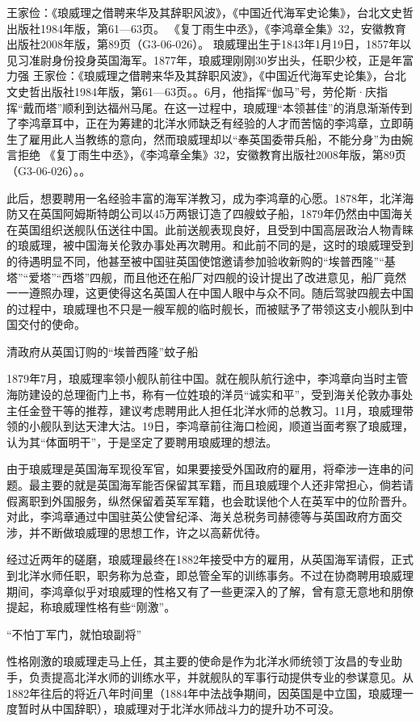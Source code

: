 \documentclass[12pt,UTF8]{ctexbook}
\begin{document}
王家俭：《琅威理之借聘来华及其辞职风波》，《中国近代海军史论集》，台北文史哲出版社1984年版，第61—63页。
《复丁雨生中丞》，《李鸿章全集》32，安徽教育出版社2008年版，第89页（G3-06-026）。
琅威理出生于1843年1月19日，1857年以见习准尉身份投身英国海军。1877年，琅威理刚刚30岁出头，任职少校，正是年富力强 王家俭：《琅威理之借聘来华及其辞职风波》，《中国近代海军史论集》，台北文史哲出版社1984年版，第61—63页。。6月，他指挥“伽马”号，劳伦斯·庆指挥“戴而塔”顺利到达福州马尾。在这一过程中，琅威理“本领甚佳”的消息渐渐传到了李鸿章耳中，正在为筹建的北洋水师缺乏有经验的人才而苦恼的李鸿章，立即萌生了雇用此人当教练的意向，然而琅威理却以“奉英国委带兵船，不能分身”为由婉言拒绝 《复丁雨生中丞》，《李鸿章全集》32，安徽教育出版社2008年版，第89页（G3-06-026）。。

此后，想要聘用一名经验丰富的海军洋教习，成为李鸿章的心愿。1878年，北洋海防又在英国阿姆斯特朗公司以45万两银订造了四艘蚊子船，1879年仍然由中国海关在英国组织送舰队伍送往中国。此前送舰表现良好，且受到中国高层政治人物青睐的琅威理，被中国海关伦敦办事处再次聘用。和此前不同的是，这时的琅威理受到的待遇明显不同，他甚至被中国驻英国使馆邀请参加验收新购的“埃普西隆”“基塔”“爱塔”“西塔”四舰，而且他还在船厂对四舰的设计提出了改进意见，船厂竟然一一遵照办理，这更使得这名英国人在中国人眼中与众不同。随后驾驶四舰去中国的过程中，琅威理也不只是一艘军舰的临时舰长，而被赋予了带领这支小舰队到中国交付的使命。


清政府从英国订购的“埃普西隆”蚊子船

1879年7月，琅威理率领小舰队前往中国。就在舰队航行途中，李鸿章向当时主管海防建设的总理衙门上书，称有一位姓琅的洋员“诚实和平”，受到海关伦敦办事处主任金登干等的推荐，建议考虑聘用此人担任北洋水师的总教习。11月，琅威理带领的小舰队到达天津大沽。19日，李鸿章前往海口检阅，顺道当面考察了琅威理，认为其“体面明干”，于是坚定了要聘用琅威理的想法。

由于琅威理是英国海军现役军官，如果要接受外国政府的雇用，将牵涉一连串的问题。最主要的就是英国海军能否保留其军籍，而且琅威理个人还非常担心，倘若请假离职到外国服务，纵然保留着英军军籍，也会耽误他个人在英军中的位阶晋升。对此，李鸿章通过中国驻英公使曾纪泽、海关总税务司赫德等与英国政府方面交涉，并不断做琅威理的思想工作，许之以高薪优待。

经过近两年的磋磨，琅威理最终在1882年接受中方的雇用，从英国海军请假，正式到北洋水师任职，职务称为总查，即总管全军的训练事务。不过在协商聘用琅威理期间，李鸿章似乎对琅威理的性格又有了一些更深入的了解，曾有意无意地和朋僚提起，称琅威理性格有些“刚激”。

“不怕丁军门，就怕琅副将”

性格刚激的琅威理走马上任，其主要的使命是作为北洋水师统领丁汝昌的专业助手，负责提高北洋水师的训练水平，并就舰队的军事行动提供专业的参谋意见。从1882年往后的将近八年时间里（1884年中法战争期间，因英国是中立国，琅威理一度暂时从中国辞职），琅威理对于北洋水师战斗力的提升功不可没。
\end{document}
